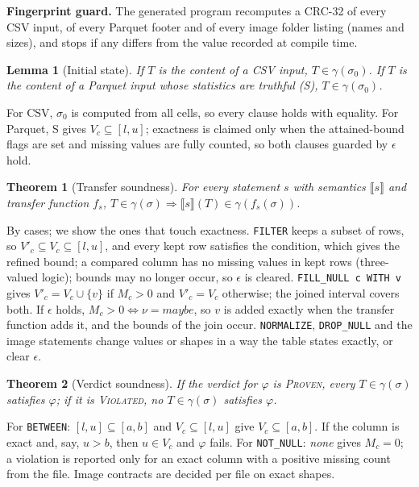 \documentclass[conference]{IEEEtran}
\newtheorem{theorem}{Theorem}
\newtheorem{lemma}{Lemma}
\begin{document}
\textbf{Fingerprint guard.} The generated program recomputes a CRC-32 of every CSV input, of every
Parquet footer and of every image folder listing (names and sizes), and stops if any differs from
the value recorded at compile time.

\begin{lemma}[Initial state]\label{lem:init}
If $T$ is the content of a CSV input, $T \in \gamma(\sigma_0)$. If $T$ is the content of a
Parquet input whose statistics are truthful (S), $T \in \gamma(\sigma_0)$.
\end{lemma}
\begin{IEEEproof}
For CSV, $\sigma_0$ is computed from all cells, so every clause holds with equality. For Parquet,
S gives $V_c \subseteq [l,u]$; exactness is claimed only when the attained-bound flags are set and
missing values are fully counted, so both clauses guarded by $\epsilon$ hold.
\end{IEEEproof}

\begin{theorem}[Transfer soundness]\label{thm:transfer}
For every statement $s$ with semantics $\llbracket s \rrbracket$ and transfer function $f_s$,
$T \in \gamma(\sigma) \Rightarrow \llbracket s \rrbracket(T) \in \gamma(f_s(\sigma))$.
\end{theorem}
\begin{IEEEproof}
By cases; we show the ones that touch exactness. \texttt{FILTER} keeps a subset of rows, so
$V'_c \subseteq V_c \subseteq [l,u]$, and every kept row satisfies the condition, which gives the
refined bound; a compared column has no missing values in kept rows (three-valued logic); bounds
may no longer occur, so $\epsilon$ is cleared. \texttt{FILL\_NULL c WITH v} gives
$V'_c = V_c \cup \{v\}$ if $M_c > 0$ and $V'_c = V_c$ otherwise; the joined interval covers both.
If $\epsilon$ holds, $M_c > 0 \Leftrightarrow \nu = \textit{maybe}$, so $v$ is added exactly when
the transfer function adds it, and the bounds of the join occur. \texttt{NORMALIZE},
\texttt{DROP\_NULL} and the image statements change values or shapes in a way the table states
exactly, or clear $\epsilon$.
\end{IEEEproof}

\begin{theorem}[Verdict soundness]\label{thm:verdict}
If the verdict for $\varphi$ is \textsc{Proven}, every $T \in \gamma(\sigma)$ satisfies $\varphi$;
if it is \textsc{Violated}, no $T \in \gamma(\sigma)$ satisfies $\varphi$.
\end{theorem}
\begin{IEEEproof}
For \texttt{BETWEEN}: $[l,u] \subseteq [a,b]$ and $V_c \subseteq [l,u]$ give $V_c \subseteq
[a,b]$. If the column is exact and, say, $u > b$, then $u \in V_c$ and $\varphi$ fails. For
\texttt{NOT\_NULL}: \textit{none} gives $M_c = 0$; a violation is reported only for an exact column
with a positive missing count from the file. Image contracts are decided per file on exact shapes.
\end{IEEEproof}
\end{document}

